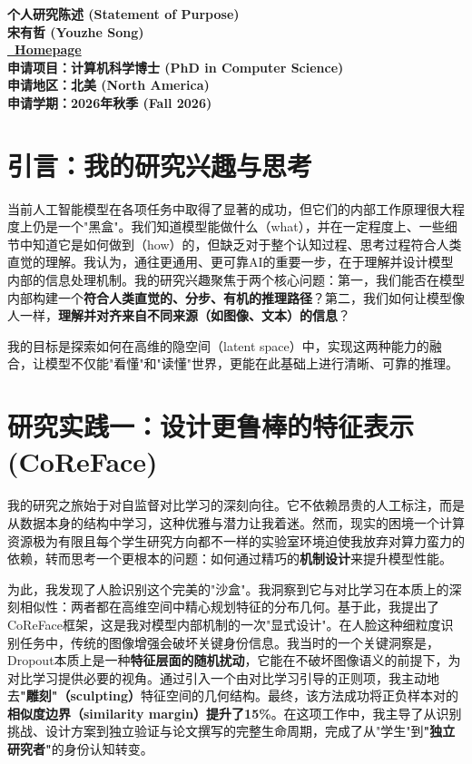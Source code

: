 \documentclass[11pt, letterpaper]{article}
\begin{document}
\begin{center}
    \fontsize{16pt}{18pt}\selectfont\bfseries
    个人研究陈述 (Statement of Purpose) \\[8pt]
    \large 宋有哲 (Youzhe Song) \\[4pt]
    \normalsize \href{https://isidoresong.github.io/}{\faHome\ Homepage} \\
    \normalsize 申请项目：计算机科学博士 (PhD in Computer Science) \\
    \normalsize 申请地区：北美 (North America) \\
    \normalsize 申请学期：2026年秋季 (Fall 2026)
\end{center}
\vspace{1em} %


\section{引言：我的研究兴趣与思考}

当前人工智能模型在各项任务中取得了显著的成功，但它们的内部工作原理很大程度上仍是一个"黑盒"。我们知道模型能做什么（what），并在一定程度上、一些细节中知道它是如何做到（how）的，但缺乏对于整个认知过程、思考过程符合人类直觉的理解。我认为，通往更通用、更可靠AI的重要一步，在于理解并设计模型内部的信息处理机制。我的研究兴趣聚焦于两个核心问题：第一，我们能否在模型内部构建一个\textbf{符合人类直觉的、分步、有机的推理路径}？第二，我们如何让模型像人一样，\textbf{理解并对齐来自不同来源（如图像、文本）的信息}？

我的目标是探索如何在高维的隐空间（latent space）中，实现这两种能力的融合，让模型不仅能"看懂"和"读懂"世界，更能在此基础上进行清晰、可靠的推理。

\section{研究实践一：设计更鲁棒的特征表示 (CoReFace)}

我的研究之旅始于对自监督对比学习的深刻向往。它不依赖昂贵的人工标注，而是从数据本身的结构中学习，这种优雅与潜力让我着迷。然而，现实的困境一个计算资源极为有限且每个学生研究方向都不一样的实验室环境迫使我放弃对算力蛮力的依赖，转而思考一个更根本的问题：如何通过精巧的\textbf{机制设计}来提升模型性能。

为此，我发现了人脸识别这个完美的"沙盒"。我洞察到它与对比学习在本质上的深刻相似性：两者都在高维空间中精心规划特征的分布几何。基于此，我提出了CoReFace框架，这是我对模型内部机制的一次"显式设计"。在人脸这种细粒度识别任务中，传统的图像增强会破坏关键身份信息。我当时的一个关键洞察是，Dropout本质上是一种\textbf{特征层面的随机扰动}，它能在不破坏图像语义的前提下，为对比学习提供必要的视角。通过引入一个由对比学习引导的正则项，我主动地去\textbf{"雕刻"（sculpting）}特征空间的几何结构。最终，该方法成功将正负样本对的\textbf{相似度边界（similarity margin）提升了15\%}。在这项工作中，我主导了从识别挑战、设计方案到独立验证与论文撰写的完整生命周期，完成了从"学生"到\textbf{"独立研究者"}的身份认知转变\cite{coreface}。
\end{document}
